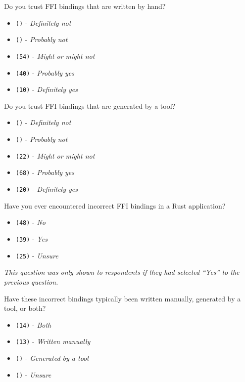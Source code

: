\begin{protocol}
\item \label{survey:ffibq3}  Do you trust FFI bindings that are written by hand?
\begin{itemize}
\item \texttt{()} - \textit{Definitely not}
\item \texttt{()} - \textit{Probably not}
\item \texttt{(54)} - \textit{Might or might not}
\item \texttt{(40)} - \textit{Probably yes}
\item \texttt{(10)} - \textit{Definitely yes}
\end{itemize}
\item \label{survey:ffibq4}  Do you trust FFI bindings that are generated by a tool?
\begin{itemize}
\item \texttt{()} - \textit{Definitely not}

\item \texttt{()} - \textit{Probably not}
\item \texttt{(22)} - \textit{Might or might not}
\item \texttt{(68)} - \textit{Probably yes}
\item \texttt{(20)} - \textit{Definitely yes}
\end{itemize}
\item \label{survey:ffibq5}  Have you ever encountered incorrect FFI bindings in a Rust application?
\begin{itemize}
\item \texttt{(48)} - \textit{No}
\item \texttt{(39)} - \textit{Yes}
\item \texttt{(25)} - \textit{Unsure}
\end{itemize}
\end{protocol}

\noindent \textit{This question was only shown to respondents if they had selected ``\textit{Yes}'' to the previous question.}
\begin{protocol}
\setcounter{protocoli}{5}
\item \label{survey:ffibq6}  Have these incorrect bindings typically been written manually, generated by a tool, or both?
\begin{itemize}
\item \texttt{(14)} - \textit{Both}
\item \texttt{(13)} - \textit{Written manually}
\item \texttt{()} - \textit{Generated by a tool}
\item \texttt{()} - \textit{Unsure}
\end{itemize}
\end{protocol}


